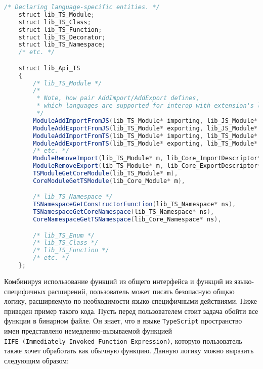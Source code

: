 \begin{lstlisting}[language=Java, caption=Примерный код расширения \texttt{Typescript}., label=lst:libTsExtension]
    /* Declaring language-specific entities. */
    struct lib_TS_Module;
    struct lib_TS_Class;
    struct lib_TS_Function;
    struct lib_TS_Decorator;
    struct lib_TS_Namespace;
    /* etc. */

    struct lib_Api_TS
    {
        /* lib_TS_Module */
        /*
         * Note, how pair AddImport/AddExport defines,
         * which languages are supported for interop with extension's language.
         */
        ModuleAddImportFromJS(lib_TS_Module* importing, lib_JS_Module* imported, ... payload);
        ModuleAddExportFromJS(lib_TS_Module* exporting, lib_JS_Module* exported, ... payload);
        ModuleAddImportFromTS(lib_TS_Module* importing, lib_TS_Module* imported, ... payload);
        ModuleAddExportFromTS(lib_TS_Module* exporting, lib_TS_Module* exported, ... payload);
        /* etc. */
        ModuleRemoveImport(lib_TS_Module* m, lib_Core_ImportDescriptor* id);
        ModuleRemoveExport(lib_TS_Module* m, lib_Core_ExportDescriptor* ed);
        TSModuleGetCoreModule(lib_TS_Module* m),
        CoreModuleGetTSModule(lib_Core_Module* m),

        /* lib_TS_Namespace */
        TSNamespaceGetConstructorFunction(lib_TS_Namespace* ns),
        TSNamespaceGetCoreNamespace(lib_TS_Namespace* ns),
        CoreNamespaceGetTSNamespace(lib_Core_Namespace* ns),

        /* lib_TS_Enum */
        /* lib_TS_Class */
        /* lib_TS_Function */
        /* etc. */
    };
\end{lstlisting}

Комбинируя использование функций из общего интерфейса и функций из языко-специфичных расширений, пользователь может писать безопасную общкю логику, расширяемую по необходимости языко-специфичными действиями. Ниже приведен пример такого кода. Пусть перед пользователем стоит задача обойти все функции в бинарном файле. Он знает, что в языке \texttt{TypeScript} пространство имен представлено немедленно-вызываемой функцией \texttt{IIFE~(Immediately~Invoked~Function~Expression)}, которую пользователь также хочет обработать как обычную функцию. Данную логику можно выразить следующим образом:

